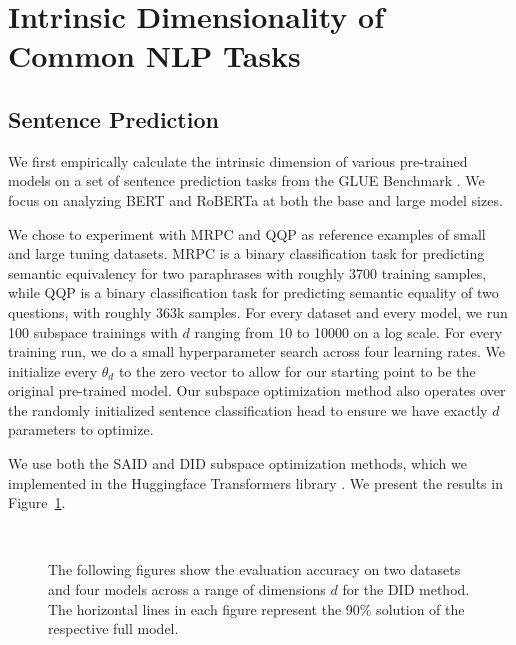 \documentclass{article} \usepackage{iclr2020_conference,times}
\begin{document}
\section{Intrinsic Dimensionality of Common NLP Tasks}
\label{sec:mes}

\subsection{Sentence Prediction}
We first empirically calculate the intrinsic dimension of various pre-trained models on a set of sentence prediction tasks from the GLUE Benchmark \citep{GLUE}. We focus on analyzing BERT \citep{BERT} and RoBERTa \citep{ROBERTA} at both the base and large model sizes.

We chose to experiment with MRPC \citep{mrpc} and QQP \citep{qqp} as reference examples of small and large tuning datasets. MRPC is a binary classification task for predicting semantic equivalency for two paraphrases with roughly 3700 training samples, while QQP is a binary classification task for predicting semantic equality of two questions, with roughly 363k samples. For every dataset and every model, we run 100 subspace trainings with $d$ ranging from 10 to 10000 on a log scale. For every training run, we do a small hyperparameter search across four learning rates. We initialize every $\theta_d$ to the zero vector to allow for our starting point to be the original pre-trained model. Our subspace optimization method also operates over the randomly initialized sentence classification head to ensure we have exactly $d$ parameters to optimize.

We use both the SAID and DID subspace optimization methods, which we implemented in the Huggingface Transformers library \citep{huggingface}. We present the results in Figure~\ref{fig:sp_DID}. 


\begin{figure}
  \centering
   \\
  \caption{The following figures show the evaluation accuracy on two datasets and four models across a range of dimensions $d$ for the DID method. The horizontal lines in each figure represent the 90\% solution of the respective full model.} \label{fig:sp_DID}
\end{figure}
\end{document}
